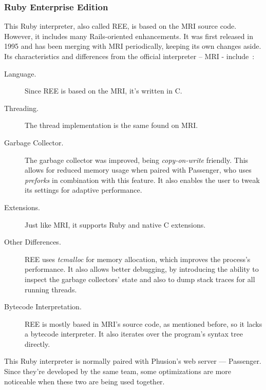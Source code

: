\subsubsection{Ruby Enterprise Edition}
This Ruby interpreter, also called REE, is based on the MRI source code. However, it includes many Rails-oriented enhancements. It was first released in 1995 and has been merging with MRI periodically, keeping its own changes aside. Its characteristics and differences from the official interpreter – MRI - include~\cite{rubyenterpriseedition}:
\begin{description}
\item[Language.] Since REE is based on the MRI, it's written in C.
\item[Threading.] The thread implementation is the same found on MRI.
\item[Garbage Collector.]  The garbage collector was improved, being \textit{copy-on-write} friendly. This allows for reduced memory usage when paired with Passenger, who uses \textit{preforks} in combination with this feature.  It also enables the user to tweak its settings for adaptive performance.
\item[Extensions.]  Just like MRI, it supports Ruby and native C extensions. 
\item[Other Differences.] REE uses \textit{tcmalloc} for memory allocation, which improves the process's performance. It also allows better debugging, by introducing the ability to inspect the garbage collectors' state and also to dump stack traces for all running threads.
\item[Bytecode Interpretation.] REE is mostly based in MRI's source code, as mentioned before, so it lacks a bytecode interpreter. It also iterates over the program's syntax tree directly.
 \end{description}
This Ruby interpreter is normally paired with Phusion's web server --- Passenger. Since they're developed by the same team, some optimizations are more noticeable when these two are being used together.


